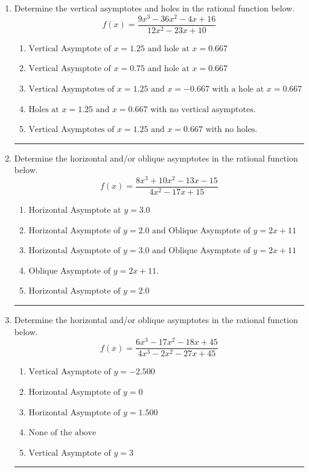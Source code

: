 \documentclass[14pt]{extbook}
\newcommand{\litem}[1]{\item#1\hspace*{-1cm}\rule{\textwidth}{0.4pt}}
\begin{document}
\begin{enumerate}
{\begin{enumerate}[label=\Alph*.]
\end{enumerate} }
\litem{
Determine the vertical asymptotes and holes in the rational function below.\[ f(x) = \frac{9x^{3} -36 x^{2} -4 x + 16}{12x^{2} -23 x + 10} \]\begin{enumerate}[label=\Alph*.]
\item \( \text{Vertical Asymptote of } x = 1.25 \text{ and hole at } x = 0.667 \)
\item \( \text{Vertical Asymptote of } x = 0.75 \text{ and hole at } x = 0.667 \)
\item \( \text{Vertical Asymptotes of } x = 1.25 \text{ and } x = -0.667 \text{ with a hole at } x = 0.667 \)
\item \( \text{Holes at } x = 1.25 \text{ and } x = 0.667 \text{ with no vertical asymptotes.} \)
\item \( \text{Vertical Asymptotes of } x = 1.25 \text{ and } x = 0.667 \text{ with no holes.} \)

\end{enumerate} }
\litem{
Determine the horizontal and/or oblique asymptotes in the rational function below.\[ f(x) = \frac{8x^{3} +10 x^{2} -13 x -15}{4x^{2} -17 x + 15} \]\begin{enumerate}[label=\Alph*.]
\item \( \text{Horizontal Asymptote at } y = 3.0 \)
\item \( \text{Horizontal Asymptote of } y = 2.0 \text{ and Oblique Asymptote of } y = 2x + 11 \)
\item \( \text{Horizontal Asymptote of } y = 3.0 \text{ and Oblique Asymptote of } y = 2x + 11 \)
\item \( \text{Oblique Asymptote of } y = 2x + 11. \)
\item \( \text{Horizontal Asymptote of } y = 2.0  \)

\end{enumerate} }
\litem{
Determine the horizontal and/or oblique asymptotes in the rational function below.\[ f(x) = \frac{6x^{3} -17 x^{2} -18 x + 45}{4x^{3} -2 x^{2} -27 x + 45} \]\begin{enumerate}[label=\Alph*.]
\item \( \text{Vertical Asymptote of } y = -2.500  \)
\item \( \text{Horizontal Asymptote of } y = 0  \)
\item \( \text{Horizontal Asymptote of } y = 1.500  \)
\item \( \text{None of the above} \)
\item \( \text{Vertical Asymptote of } y = 3  \)


\end{enumerate}}
\end{enumerate}
\end{document}
